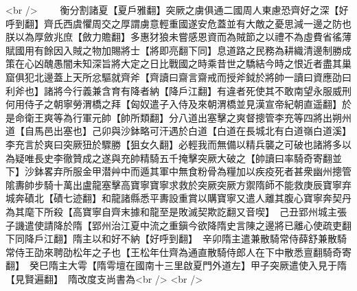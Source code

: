 <br />
　　衡分割諸夏【夏戶雅翻】突厥之虜俱通二國周人東慮恐齊好之深【好呼到翻】齊氏西虞懼周交之厚謂虜意輕重國遂安危蓋並有大敵之憂思減一邊之防也朕以為厚斂兆庶【斂力贍翻】多惠犲狼未嘗感恩資而為賊節之以禮不為虛費省徭薄賦國用有餘因入賊之物加賜將士【將即亮翻下同】息道路之民務為耕織清邊制勝成策在心凶醜愚闇未知深旨將大定之日比戰國之時乘昔世之驕結今時之恨近者盡其巢窟俱犯北邊蓋上天所忿驅就齊斧【齊讀曰齋言齋戒而授斧鉞於將帥一讀曰資應劭曰利斧也】諸將今行義兼含育有降者納【降戶江翻】有違者死使其不敢南望永服威刑何用侍子之朝寧勞渭橋之拜【匈奴遣子入侍及來朝渭橋並見漢宣帝紀朝直遥翻】於是命衛王爽等為行軍元帥【帥所類翻】分八道出塞擊之爽督摠管李充等四將出朔州道【自馬邑出塞也】己卯與沙鉢略可汗遇於白道【白道在長城北有白道嶺白道溪】李充言於爽曰突厥狃於驟勝【狙女久翻】必輕我而無備以精兵襲之可破也諸將多以為疑唯長史李徹贊成之遂與充帥精騎五千掩擊突厥大破之【帥讀曰率騎奇寄翻並下】沙鉢畧弃所服金甲潜艸中而遁其軍中無食粉骨為糧加以疾疫死者甚衆幽州摠管隂夀帥步騎十萬出盧龍塞擊高寶寧寶寧求救於突厥突厥方禦隋師不能救庚辰寶寧弃城奔磧北【磧七迹翻】和龍諸縣悉平夀設重賞以購寶寧又遣人離其腹心寶寧奔契丹為其麾下所殺【高寶寧自齊末據和龍至是敗滅契欺訖翻又音喫】　己丑郢州城主張子譏遣使請降於隋【郢州治江夏中流之重鎭今欲降隋史言陳之邊將已離心使疏吏翻下同降戶江翻】隋主以和好不納【好呼到翻】　辛卯隋主遣兼散騎常侍薛舒兼散騎常侍王劭來聘劭松年之子也【王松年仕齊為通直散騎侍郎人在下中散悉亶翻騎奇寄翻】　癸巳隋主大雩【隋雩壇在國南十三里啟夏門外道左】甲子突厥遣使入見于隋【見賢遍翻】　隋改度支尚書為<br />
<br />
